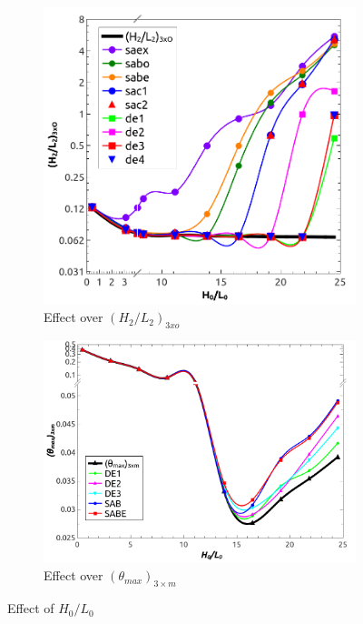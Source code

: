\documentclass[10pt,fleqn,a4paper,twoside]{article}
\begin{document}
\begin{figure}[h]
\centering
	\begin{subfigure}{0.52\textwidth}
		\centering
		\includegraphics[width=1\linewidth]{imgs/h0l0_h2l2.png}
		\caption{ {\small Effect over $(H_{2}/L_{2})_{3xo}$}}
		\label{figure02:sub1}
	\end{subfigure}%
	\begin{subfigure}{0.52\textwidth}
		\centering
		\includegraphics[width=1\linewidth]{imgs/h0l0_tmim_en}
		\caption{ {\small Effect over $({\theta}_{max})_{3\times m}$}}
		\label{figure02:sub2}
	\end{subfigure}%
\caption{Effect of $H_{0}/L_{0}$}
\label{figure02}
\end{figure}
\end{document}
